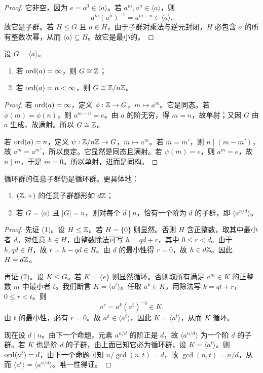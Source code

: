 \begin{proof}
它非空，因为 $e=a^0\in \langle a \rangle$。若 $a^m,a^n\in \langle a \rangle$，则
\[
 a^m(a^n)^{-1}=a^{m-n} \in \langle a \rangle.
\]
故它是子群。若 $H\le G$ 且 $a\in H$，由于子群对乘法与逆元封闭，$H$ 必包含 $a$ 的所有整数次幂，从而 $\langle a \rangle\subseteq H$。故它是最小的。
\end{proof}

\begin{theorem}[循环群分类]
设 $G=\langle a \rangle$。
\begin{enumerate}[label=\textnormal{(\arabic*)}, leftmargin=3em]
  \item 若 $\mathrm{ord}(a)=\infty$，则 $G\cong \mathbb{Z}$；
  \item 若 $\mathrm{ord}(a)=n<\infty$，则 $G\cong \mathbb{Z}/n\mathbb{Z}$。
\end{enumerate}
\end{theorem}

\begin{proof}
若 $\mathrm{ord}(a)=\infty$，定义 $\phi:\mathbb{Z}\to G$，$m\mapsto a^m$。它是同态。若 $\phi(m)=\phi(n)$，则 $a^{m-n}=e$。由 $a$ 的阶无穷，得 $m=n$，故单射；又因 $G$ 由 $a$ 生成，故满射。所以 $G\cong \mathbb{Z}$。

若 $\mathrm{ord}(a)=n$，定义 $\psi:\mathbb{Z}/n\mathbb{Z}\to G$，$\bar m\mapsto a^m$。若 $\bar m=\bar m'$，则 $n\mid(m-m')$，故 $a^m=a^{m'}$，所以良定。它显然是同态且满射。若 $\psi(\bar m)=e$，则 $a^m=e$，故 $n\mid m$，于是 $\bar m=\bar 0$。所以单射，进而是同构。
\end{proof}

\begin{theorem}[循环群的子群]
循环群的任意子群仍是循环群。更具体地：
\begin{enumerate}[label=\textnormal{(\arabic*)}, leftmargin=3em]
  \item $(\mathbb{Z},+)$ 的任意子群都形如 $d\mathbb{Z}$；
  \item 若 $G=\langle a \rangle$ 且 $|G|=n$，则对每个 $d\mid n$，恰有一个阶为 $d$ 的子群，即 $\langle a^{n/d} \rangle$。
\end{enumerate}
\end{theorem}

\begin{proof}
先证 (1)。设 $H\le \mathbb{Z}$。若 $H=\{0\}$ 则显然。否则 $H$ 含正整数，取其中最小者 $d$。对任意 $h\in H$，由整数除法可写 $h=qd+r$，其中 $0\le r<d$。由于 $h,qd\in H$，故 $r=h-qd\in H$。由 $d$ 的最小性得 $r=0$，故 $h\in d\mathbb{Z}$。因此 $H=d\mathbb{Z}$。

再证 (2)。设 $K\le G$。若 $K=\{e\}$ 则显然循环。否则取所有满足 $a^m\in K$ 的正整数 $m$ 中最小者 $t$。我们断言 $K=\langle a^t \rangle$。任取 $a^k\in K$，用除法写 $k=qt+r$，$0\le r<t$。则
\[
 a^r=a^k(a^t)^{-q} \in K.
\]
由 $t$ 的最小性，必有 $r=0$。故 $a^k\in \langle a^t \rangle$，因此 $K=\langle a^t \rangle$，从而 $K$ 循环。

现在设 $d\mid n$。由下一个命题，元素 $a^{n/d}$ 的阶正是 $d$，故 $\langle a^{n/d} \rangle$ 为一个阶 $d$ 的子群。若 $K$ 也是阶 $d$ 的子群，由上面已知它必为循环群，设 $K=\langle a^t \rangle$。则 $\mathrm{ord}(a^t)=d$，由下一个命题可知 $n/\gcd(n,t)=d$，故 $\gcd(n,t)=n/d$，从而 $\langle a^t \rangle=\langle a^{n/d} \rangle$。唯一性得证。
\end{proof}

